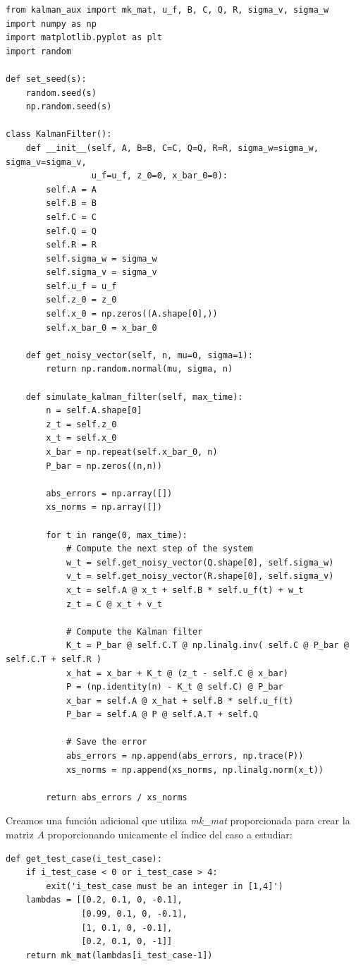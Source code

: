 \documentclass[a4paper]{article}
\begin{document}
\begin{verbatim}
from kalman_aux import mk_mat, u_f, B, C, Q, R, sigma_v, sigma_w
import numpy as np
import matplotlib.pyplot as plt
import random

def set_seed(s):
	random.seed(s)
	np.random.seed(s)

class KalmanFilter():
	def __init__(self, A, B=B, C=C, Q=Q, R=R, sigma_w=sigma_w, sigma_v=sigma_v,
				 u_f=u_f, z_0=0, x_bar_0=0):
		self.A = A
		self.B = B
		self.C = C
		self.Q = Q
		self.R = R
		self.sigma_w = sigma_w
		self.sigma_v = sigma_v
		self.u_f = u_f
		self.z_0 = z_0
		self.x_0 = np.zeros((A.shape[0],))
		self.x_bar_0 = x_bar_0
		
	def get_noisy_vector(self, n, mu=0, sigma=1):
		return np.random.normal(mu, sigma, n)
	
	def simulate_kalman_filter(self, max_time):
		n = self.A.shape[0]
		z_t = self.z_0
		x_t = self.x_0
		x_bar = np.repeat(self.x_bar_0, n)
		P_bar = np.zeros((n,n))
		
		abs_errors = np.array([])
		xs_norms = np.array([])
			
		for t in range(0, max_time):
			# Compute the next step of the system
			w_t = self.get_noisy_vector(Q.shape[0], self.sigma_w)
			v_t = self.get_noisy_vector(R.shape[0], self.sigma_v)
			x_t = self.A @ x_t + self.B * self.u_f(t) + w_t
			z_t = C @ x_t + v_t
			
			# Compute the Kalman filter
			K_t = P_bar @ self.C.T @ np.linalg.inv( self.C @ P_bar @ self.C.T + self.R )
			x_hat = x_bar + K_t @ (z_t - self.C @ x_bar)
			P = (np.identity(n) - K_t @ self.C) @ P_bar
			x_bar = self.A @ x_hat + self.B * self.u_f(t)
			P_bar = self.A @ P @ self.A.T + self.Q
			
			# Save the error
			abs_errors = np.append(abs_errors, np.trace(P))
			xs_norms = np.append(xs_norms, np.linalg.norm(x_t))
		
		return abs_errors / xs_norms
\end{verbatim}

Creamos una función adicional que utiliza \emph{mk\_mat} proporcionada para crear la matriz $A$ proporcionando unicamente el índice del caso a estudiar:

\begin{verbatim}
def get_test_case(i_test_case):
	if i_test_case < 0 or i_test_case > 4:
		exit('i_test_case must be an integer in [1,4]')
	lambdas = [[0.2, 0.1, 0, -0.1], 
			   [0.99, 0.1, 0, -0.1],
			   [1, 0.1, 0, -0.1],
			   [0.2, 0.1, 0, -1]]
	return mk_mat(lambdas[i_test_case-1])
\end{verbatim}
\end{document}
